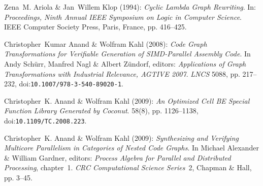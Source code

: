 \documentclass[copyright]{eptcs}
\newcounter{x}
\newcounter{y}
\newcounter{z}
\begin{document}
\begin{thebibliography}{HFBV97}
\providecommand{\bibitemdeclare}[2]{}
\providecommand{\bibitemend}{}
\providecommand{\bibliographystart}{}
\providecommand{\bibliographyend}{}
\providecommand{\urlprefix}{Available at }
\providecommand{\url}[1]{\texttt{#1}}
\providecommand{\href}[2]{\texttt{#2}}
\providecommand{\urlalt}[2]{\href{#1}{#2}}
\providecommand{\doi}[1]{doi:\urlalt{http://dx.doi.org/#1}{#1}}
\providecommand{\bibinfo}[2]{#2}
\bibliographystart

\bibitemdeclare{inproceedings}{Ariola-Klop-1994}
\bibinfo{author}{Zena~M. Ariola} \& \bibinfo{author}{Jan~Willem Klop}
  (\bibinfo{year}{1994}): \emph{\bibinfo{title}{Cyclic Lambda Graph
  Rewriting}}.
\newblock In: {\sl \bibinfo{booktitle}{Proceedings, Ninth Annual IEEE Symposium
  on Logic in Computer Science}}. \bibinfo{organization}{IEEE Computer Society
  Press}, \bibinfo{address}{Paris, France}, pp. \bibinfo{pages}{416--425}.
\bibitemend

\bibitemdeclare{inproceedings}{Anand-Kahl-2007_AGTIVE}
\bibinfo{author}{Christopher~Kumar Anand} \& \bibinfo{author}{Wolfram Kahl}
  (\bibinfo{year}{2008}): \emph{\bibinfo{title}{Code Graph Transformations for
  Verifiable Generation of {SIMD}-Parallel Assembly Code}}.
\newblock In \bibinfo{editor}{Andy Sch{\"u}rr}, \bibinfo{editor}{Manfred Nagl}
  \& \bibinfo{editor}{Albert Z{\"u}ndorf}, editors: {\sl
  \bibinfo{booktitle}{Applications of Graph Transformations with Industrial
  Relevance, {AGTIVE 2007}}}. {\sl \bibinfo{series}{LNCS}}
  \bibinfo{volume}{5088}, pp. \bibinfo{pages}{217--232},
  \doi{10.1007/978-3-540-89020-1}.
\bibitemend

\bibitemdeclare{article}{Anand-Kahl-2009b}
\bibinfo{author}{Christopher~K. Anand} \& \bibinfo{author}{Wolfram Kahl}
  (\bibinfo{year}{2009}): \emph{\bibinfo{title}{An Optimized {Cell BE} Special
  Function Library Generated by {Coconut}}}.
\newblock {\sl \bibinfo{journal}{IEEE Transactions on Computers}}
  \bibinfo{volume}{58}(\bibinfo{number}{8}), pp. \bibinfo{pages}{1126--1138},
  \doi{10.1109/TC.2008.223}.
\bibitemend

\bibitemdeclare{incollection}{Anand-Kahl-2009a}
\bibinfo{author}{Christopher~K. Anand} \& \bibinfo{author}{Wolfram Kahl}
  (\bibinfo{year}{2009}): \emph{\bibinfo{title}{Synthesizing and Verifying
  Multicore Parallelism in Categories of Nested Code Graphs}}.
\newblock In \bibinfo{editor}{Michael Alexander} \& \bibinfo{editor}{William
  Gardner}, editors: {\sl \bibinfo{booktitle}{Process Algebra for Parallel and
  Distributed Processing}}, chapter~\bibinfo{chapter}{1}. {\sl
  \bibinfo{series}{CRC Computational Science Series}}~\bibinfo{volume}{2},
  \bibinfo{publisher}{Chapman \& Hall}, pp. \bibinfo{pages}{3--45}.
\bibitemend


\end{thebibliography}
\end{document}
